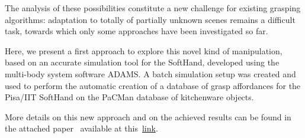 The analysis of these possibilities constitute a new challenge for existing grasping algorithms: adaptation to totally of partially unknown scenes remains a difficult task, towards which only some approaches have been investigated so far. 

Here, we present a first approach to explore this novel kind of manipulation, based on an accurate simulation tool for the SoftHand, developed using the multi-body system software ADAMS. A batch simulation setup was created and used to perform the automatic creation of a database of grasp affordances for the Pisa/IIT SoftHand on the PaCMan database of kitchenware objects. 

More details on this new approach and on the achieved results can be found in the attached paper~\cite{Bonilla:Humanoids:2015} available at this~\href{./attachedPapers/GraspingWithSoftHands.pdf}{link}. 
